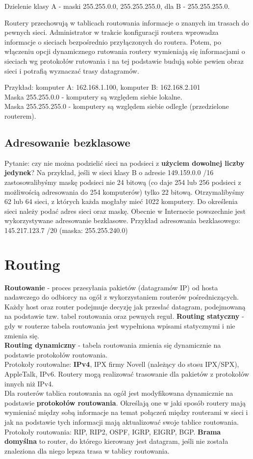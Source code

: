\documentclass[a4paper]{article}
\begin{document}
Dzielenie klasy A - maski 255.255.0.0, 255.255.255.0, dla B - 255.255.255.0.

Routery przechowują w tablicach routowania informacje o znanych im trasach do pewnych sieci. Administrator w trakcie konfiguracji routera wprowadza informacje o sieciach bezpośrednio przyłączonych do routera. Potem, po włączeniu opcji dynamicznego rutowania
routery wymieniają się informacjami o sieciach wg protokołów rutowania i na tej podstawie budują sobie pewien obraz
sieci i potrafią wyznaczać trasy datagramów.

Przykład: komputer A: 162.168.1.100, komputer B: 162.168.2.101\\
Maska 255.255.0.0 - komputery są względem siebie lokalne.\\
Maska 255.255.255.0 - komputery są względem siebie odległe (przedzielone routerem).

\subsection{Adresowanie bezklasowe}
Pytanie: czy nie można podzielić sieci na podsieci
z \textbf{użyciem dowolnej liczby jedynek}? Na przykład, jeśli w sieci klasy B o
adresie 149.159.0.0 /16 zastosowalibyśmy maskę podsieci nie 24 bitową (co daje 254 lub
256 podsieci z możliwością adresowania do 254 komputerów) tylko 22 bitową.
Otrzymalibyśmy 62 lub 64 sieci, z których każda mogłaby mieć 1022 komputery. Do określenia sieci należy podać adres
sieci oraz maskę. Obecnie w Internecie powszechnie jest wykorzystywane adresowanie
bezklasowe.
Przykład adresowania bezklasowego: 145.217.123.7 /20 (maska: 255.255.240.0)


\section{Routing}
\textbf{Routowanie} - proces przesyłania pakietów (datagramów IP) od hosta nadawczego do
odbiorcy na ogół z wykorzystaniem routerów pośredniczących. Każdy host oraz router podejmuje decyzję jak przesłać datagram, podejmowaną na podstawie tzw. tabel routowania oraz pewnych reguł.
\textbf{Routing statyczny} - gdy w routerze tabela routowania jest wypełniona wpisami statycznymi i nie zmienia się.\\
\textbf{Routing dynamiczny} - tabela routowania zmienia się dynamicznie na podstawie protokołów routowania.\\
Protokoły routowalne: \textbf{IPv4}, IPX firmy Novell (należący do stosu IPX/SPX), AppleTalk, IPv6. Routery mogą realizować trasowanie dla pakietów z
protokołów innych niż IPv4.\\
Dla routerów tablica routowania na ogół jest modyfikowana dynamicznie na podstawie \textbf{protokołów routowania}. Określają one w jaki sposób routery mają wymieniać między sobą informacje na temat połączeń między routerami w sieci i jak na podstawie tych informacji mają aktualizować swoje tablice routowania.\\
Protokoły routowania: RIP, RIP2, OSPF, IGRP, EIGRP, BGP.
\textbf{Brama domyślna} to router, do którego kierowany jest datagram, jeśli nie została znaleziona dla niego lepsza trasa w tablicy routowania.\\
\end{document}
